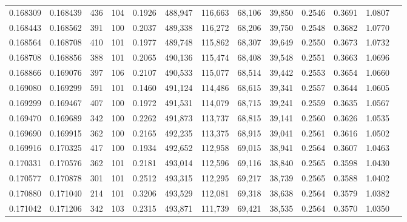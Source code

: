 \begin{tabular}{rrrrrrrrrrrrr}
0.168309 & 0.168439 &   436 & 104 &                                     0.1926 & 488,947 & 116,663 &  68,106 &  39,850 & 0.2546 & 0.3691 & 1.0807 \\
0.168443 & 0.168562 &   391 & 100 &                                     0.2037 & 489,338 & 116,272 &  68,206 &  39,750 & 0.2548 & 0.3682 & 1.0770 \\
0.168564 & 0.168708 &   410 & 101 &                                     0.1977 & 489,748 & 115,862 &  68,307 &  39,649 & 0.2550 & 0.3673 & 1.0732 \\
0.168708 & 0.168856 &   388 & 101 &                                     0.2065 & 490,136 & 115,474 &  68,408 &  39,548 & 0.2551 & 0.3663 & 1.0696 \\
0.168866 & 0.169076 &   397 & 106 &                                     0.2107 & 490,533 & 115,077 &  68,514 &  39,442 & 0.2553 & 0.3654 & 1.0660 \\
0.169080 & 0.169299 &   591 & 101 &                                     0.1460 & 491,124 & 114,486 &  68,615 &  39,341 & 0.2557 & 0.3644 & 1.0605 \\
0.169299 & 0.169467 &   407 & 100 &                                     0.1972 & 491,531 & 114,079 &  68,715 &  39,241 & 0.2559 & 0.3635 & 1.0567 \\
0.169470 & 0.169689 &   342 & 100 &                                     0.2262 & 491,873 & 113,737 &  68,815 &  39,141 & 0.2560 & 0.3626 & 1.0535 \\
0.169690 & 0.169915 &   362 & 100 &                                     0.2165 & 492,235 & 113,375 &  68,915 &  39,041 & 0.2561 & 0.3616 & 1.0502 \\
0.169916 & 0.170325 &   417 & 100 &                                     0.1934 & 492,652 & 112,958 &  69,015 &  38,941 & 0.2564 & 0.3607 & 1.0463 \\
0.170331 & 0.170576 &   362 & 101 &                                     0.2181 & 493,014 & 112,596 &  69,116 &  38,840 & 0.2565 & 0.3598 & 1.0430 \\
0.170577 & 0.170878 &   301 & 101 &                                     0.2512 & 493,315 & 112,295 &  69,217 &  38,739 & 0.2565 & 0.3588 & 1.0402 \\
0.170880 & 0.171040 &   214 & 101 &                                     0.3206 & 493,529 & 112,081 &  69,318 &  38,638 & 0.2564 & 0.3579 & 1.0382 \\
0.171042 & 0.171206 &   342 & 103 &                                     0.2315 & 493,871 & 111,739 &  69,421 &  38,535 & 0.2564 & 0.3570 & 1.0350 \\

\end{tabular}
